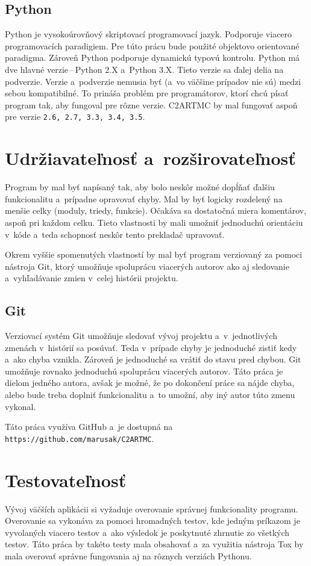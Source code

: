 \subsection{Python}
\label{subsec_python}
Python je vysokoúrovňový skriptovací programovací jazyk. Podporuje viacero programovacích
paradigiem. Pre túto prácu bude použité objektovo orientované paradigma. Zároveň Python podporuje
dynamickú typovú kontrolu.
Python má dve hlavné verzie\,--\,Python 2.X a~Python 3.X. Tieto verzie sa ďalej delia na podverzie.
Verzie a~podverzie nemusia byť (a~vo väčšine prípadov nie sú) medzi sebou kompatibilné. To prináša problém
pre programátorov, ktorí chcú písať program tak, aby fungoval pre rôzne verzie.
C2ARTMC by mal fungovať aspoň pre verzie \texttt{2.6, 2.7, 3.3, 3.4, 3.5}.

\section{Udržiavateľnosť a~rozširovateľnosť}
Program by mal byť napísaný tak, aby bolo neskôr možné dopĺňať ďalšiu funkcionalitu a~prípadne opravovať chyby. Mal by byť logicky rozdelený na menšie celky (moduly, triedy, funkcie). Očakáva sa dostatočná miera komentárov, aspoň pri každom celku. Tieto vlastnosti by mali umožniť jednoduchú orientáciu v~kóde a~teda schopnosť neskôr tento prekladač upravovať.

Okrem vyššie spomenutých vlastností by mal byť program verziovaný za pomoci nástroja Git, ktorý umožňuje spoluprácu viacerých autorov ako aj sledovanie a~vyhľadávanie zmien v~celej histórii projektu.

\subsection{Git}
Verziovací systém Git umožňuje sledovať vývoj projektu a~v~jednotlivých zmenách
v~histórií sa posúvať. Teda v~prípade chyby je jednoduché zistiť kedy a~ako chyba
vznikla. Zároveň je jednoduché sa vrátiť do stavu pred chybou.
Git umožňuje rovnako jednoduchú spoluprácu viacerých autorov. Táto práca je dielom jedného autora, avšak je možné, že po dokončení práce sa nájde
chyba, alebo bude treba doplniť funkcionalitu a~to umožní, aby iný autor túto zmenu
vykonal.

Táto práca využíva GitHub a~je dostupná na \texttt{https://github.com/marusak/C2ARTMC}.

\section{Testovateľnosť}
Vývoj väčších aplikácii si vyžaduje overovanie správnej funkcionality programu. Overovanie sa vykonáva za pomoci hromadných testov, kde jedným príkazom je vyvolaných viacero testov a~ako výsledok je poskytnuté zhrnutie zo všetkých testov. Táto práca by takéto testy mala obsahovať a~za využitia nástroja Tox by mala overovať správne fungovania aj na rôznych verziách Pythonu.

